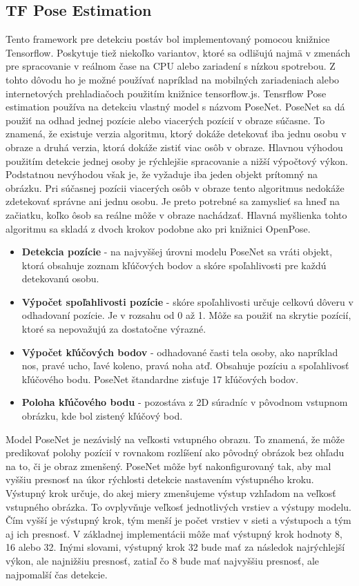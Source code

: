 \documentclass[slovak,master,dept460,male,cpp,cpdeclaration]{diploma}
\begin{document}
\newpage
\subsection{TF Pose Estimation}
Tento framework pre detekciu postáv bol implementovaný pomocou knižnice Tensorflow. Poskytuje tiež niekoľko variantov, ktoré sa odlišujú najmä v zmenách pre spracovanie v reálnom čase na CPU alebo zariadení s nízkou spotrebou. Z tohto dôvodu ho je  možné používať napríklad na mobilných zariadeniach alebo internetových prehladiačoch použitím knižnice tensorflow.js. Tensrflow Pose estimation používa na detekciu  vlastný model s názvom PoseNet. PoseNet sa dá použiť na odhad jednej pozície alebo viacerých pozícií v obraze súčasne. To znamená, že existuje verzia algoritmu, ktorý dokáže detekovať iba jednu osobu v obraze a druhá verzia, ktorá dokáže zistiť viac osôb v obraze. Hlavnou výhodou použitím detekcie jednej osoby je rýchlejšie spracovanie a nižší výpočtový výkon. Podstatnou nevýhodou však je, že vyžaduje iba jeden objekt prítomný na obrázku. Pri súčasnej pozícii viacerých osôb v obraze tento algoritmus nedokáže zdetekovať správne ani jednu osobu. Je preto potrebné sa zamyslieť sa  hneď na začiatku, koľko ôsob sa reálne môže v obraze nachádzať. Hlavná myšlienka tohto algoritmu sa skladá z dvoch krokov podobne ako pri knižnici OpenPose.

\begin{itemize}
\item \textbf{Detekcia pozície} - na najvyššej úrovni modelu PoseNet sa vráti objekt, ktorá obsahuje zoznam kľúčových bodov a skóre spoľahlivosti pre každú detekovanú osobu.
\item \textbf{Výpočet spoľahlivosti pozície} - skóre spoľahlivosti určuje celkovú dôveru v odhadovaní pozície. Je v rozsahu od 0 až 1. Môže sa použiť na skrytie pozícií, ktoré sa nepovažujú za dostatočne výrazné.
\item \textbf{Výpočet kľúčových bodov} - odhadované časti tela osoby, ako napríklad nos, pravé ucho, ľavé koleno, pravá noha atď. Obsahuje pozíciu a spoľahlivosť kľúčového bodu. PoseNet štandardne zisťuje 17 kľúčových bodov.
\item \textbf{Poloha kľúčového bodu} - pozostáva z 2D súradníc v pôvodnom vstupnom obrázku, kde bol zistený kľúčový bod.
\end{itemize}


Model PoseNet je nezávislý na veľkosti vstupného obrazu. To znamená, že môže predikovať polohy pozícií v rovnakom rozlíšení ako pôvodný obrázok bez ohľadu na to, či je obraz zmenšený. PoseNet môže byť nakonfigurovaný tak, aby mal vyššiu presnosť na úkor rýchlosti detekcie nastavením výstupného kroku. Výstupný krok určuje, do akej miery zmenšujeme výstup vzhľadom na veľkosť vstupného obrázka. To ovplyvňuje veľkosť jednotlivých vrstiev a výstupy modelu. Čím vyšší je výstupný krok, tým menší je počet vrstiev v sieti a výstupoch a tým aj ich presnosť. V základnej implementácii môže mať výstupný krok hodnoty 8, 16 alebo 32. Inými slovami, výstupný krok 32 bude mať za následok najrýchlejší výkon, ale najnižšiu presnosť, zatiaľ čo 8 bude mať najvyššiu presnosť, ale najpomalší čas detekcie.
\end{document}
